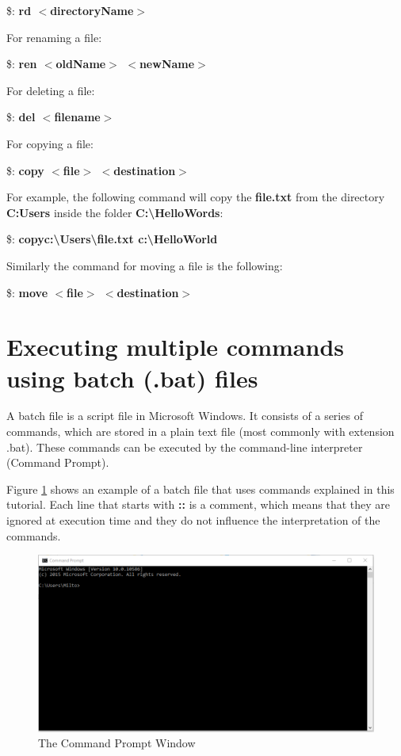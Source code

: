\documentclass{article}
\begin{document}
	\par \$: \textbf{rd $<$directoryName$>$}
	
	\par For renaming a file:
	
	\$: \textbf{ren $<$oldName$>$ $<$newName$>$}
	
	\par For deleting a file:
	
	\$: \textbf{del $<$filename$>$}
	
	\par For copying a file:
	
	\par \$: \textbf{copy $<$file$>$ $<$destination$>$}
	
	\par For example, the following command will copy the \textbf{file.txt} from the directory \textbf{C:Users} inside the folder \textbf{C:\textbackslash HelloWords}:
	
	\par \$: 	\textbf{copy\space\space c:\textbackslash Users\textbackslash file.txt \space c:\textbackslash HelloWorld 
	 }
	 
    \par Similarly the command for moving a file is the following:
    
    
    \par \$: \textbf{move $<$file$>$ $<$destination$>$}
	
	\newpage
	\section{Executing multiple commands using batch (.bat) files}
	\par A batch file is a script file in Microsoft Windows. It consists of a series of commands, which are stored in a plain text file (most commonly with extension .bat). These commands can be executed by the command-line interpreter (Command Prompt).
    
    \par Figure \ref{fig:BatchFile} shows an example of a batch file that uses commands explained in this tutorial. Each line that starts with \textbf{::} is a comment, which means that they are ignored at execution time and they do not influence the interpretation of the commands. 
	
		\begin{figure}[!htbp]
			\includegraphics[width=\textwidth]{CommandPrompt.png}
			\caption{The Command Prompt Window}
			\label{fig:BatchFile}
		\end{figure}
	 
\end{document}
